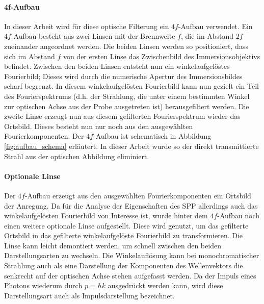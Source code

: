 \documentclass[titlepage,  ngerman]{article}
\begin{document}
	\paragraph{4f-Aufbau}
	In dieser Arbeit wird für diese optische Filterung ein $4f$-Aufbau verwendet. Ein $4f$-Aufbau besteht aus zwei Linsen mit der Brennweite $f$, die im Abstand $2f$ zueinander angeordnet werden. Die beiden Linsen werden so positioniert, dass sich im Abstand $f$ von der ersten Linse das Zwischenbild des Immersionsobjektivs befindet. Zwischen den beiden Linsen entsteht nun ein winkelaufgelöstes Fourierbild; Dieses wird durch die numerische Apertur des Immersionsbildes scharf begrenzt.  In diesem winkelaufgelösten Fourierbild kann nun gezielt ein Teil des Fourierspektrums (d.h. der Strahlung, die unter einem bestimmten Winkel zur optischen Achse aus der Probe ausgetreten ist) herausgefiltert werden. Die zweite Linse erzeugt nun aus diesem gefilterten Fourierspektrum wieder das Ortsbild. Dieses besteht nun nur noch aus den ausgewählten Fourierkomponenten. Der $4f$-Aufbau ist schematisch in Abbildung \ref{fig:aufbau_schema} erläutert. In dieser Arbeit wurde so der direkt transmittierte Strahl aus der optischen Abbildung eliminiert.
	\paragraph{Optionale Linse}
	Der $4f$-Aufbau erzeugt aus den ausgewählten Fourierkomponenten ein Ortsbild der Anregung. Da für die Analyse der Eigenschaften des SPP allerdings auch das winkelaufgelösten Fourierbild von Interesse ist, wurde hinter dem $4f$-Aufbau noch einen weitere optionale Linse aufgestellt. Diese wird genutzt, um das gefilterte Ortsbild in das gefilterte winkelaufgelöste Fourierbild zu transformieren. Die Linse kann leicht demontiert werden, um schnell zwischen den beiden Darstellungsarten zu wechseln. Die Winkelauflösung kann bei monochromatischer Strahlung auch als eine Darstellung der Komponenten des Wellenvektors die senkrecht auf der optischen Achse stehen aufgefasst werden. Da der Impuls eines Photons wiederum durch $p = \hbar k$ ausgedrückt werden kann, wird diese Darstellungsart auch als Impulsdarstellung bezeichnet.
\end{document}
